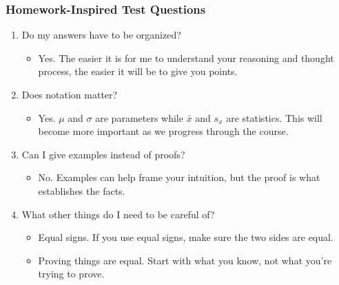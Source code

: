 \documentclass{beamer}
\begin{document}
\begin{frame}
\frametitle{Homework-Inspired Test Questions}
    \begin{enumerate}[<+- | alert@+>]
        \item Do my answers have to be organized?
        	\begin{itemize}
        		\item Yes. The easier it is for me to understand your reasoning and thought process, the easier it will be to give you points.
        	\end{itemize}
        	\item Does notation matter?
        		\begin{itemize}
        			\item Yes. $\mu$ and $\sigma$ are parameters while $\bar{x}$ and $s_x$ are statistics. This will become more important as we progress through the course.
        		\end{itemize}
        	\item Can I give examples instead of proofs?
        		\begin{itemize}
        			\item No. Examples can help frame your intuition, but the proof is what establishes the facts.
        		\end{itemize}
        	\item What other things do I need to be careful of?
        		\begin{itemize}
        			\item Equal signs. If you use equal signs, make sure the two sides are equal.
        			\item Proving things are equal. Start with what you know, not what you're trying to prove.
        		\end{itemize}
    \end{enumerate}
\end{frame} 
\end{document}
